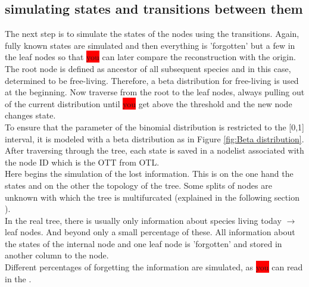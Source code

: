     \subsection{simulating states and transitions between them}
      The next step is to simulate the states of the nodes using the transitions. Again, fully known 
        states are simulated and then everything is 'forgotten' but a few in the leaf nodes so that 
        \colorbox{red}{you} can later compare the reconstruction with the origin. \\
      The root node is defined as ancestor of all subsequent species and in this case, determined to be
        free-living. Therefore, a beta distribution for free-living is used at the beginning. Now 
        traverse from the root to the leaf nodes, always pulling out of the current distribution until 
        \colorbox{red}{you} get above the threshold and the new node changes state.  \\
      To ensure that the parameter of the binomial distribution is restricted to the [0,1] interval, it 
        is modeled with a beta distribution as in Figure \ref{fig:Beta distribution}. \\

      After traversing through the tree, each state is saved in a nodelist associated with the node ID 
        which is the OTT from OTL. \\

      Here begins the simulation of the lost information. This is on the one hand the states and on the 
        other the topology of the tree. Some splits of nodes are unknown with which the tree is 
        multifurcated (explained in the following section ). \\

      In the real tree, there is usually only information about species living today $\rightarrow$ leaf 
        nodes. And beyond only a small percentage of these. All information about the states of the 
        internal node and one leaf node is 'forgotten' and stored in another column to the node. \\
      Different percentages of forgetting the information are simulated, as \colorbox{red}{you} can read 
      in the .

